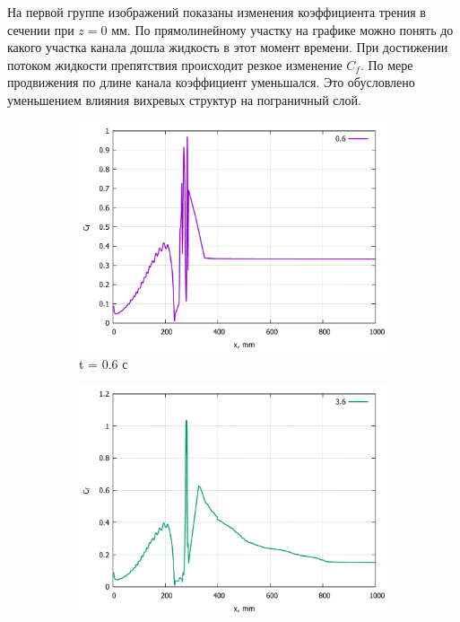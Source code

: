 	На первой группе изображений показаны изменения коэффициента трения в сечении при $z = 0$ мм. По прямолинейному участку на графике  можно понять до какого участка канала дошла жидкость в этот момент времени. При достижении потоком жидкости препятствия происходит резкое изменение $C_f$. По мере продвижения по длине канала коэффициент уменьшался. Это обусловлено уменьшением влияния вихревых структур на пограничный слой.
	\begin{figure}[H]
		\begin{subfigure}{.5\textwidth}
			\centering
			\includegraphics[width=1\linewidth]{../Assets/Cf-T06}
			\caption{t = 0.6 с}
			\label{fig:Cf-T06}
		\end{subfigure}%
		\begin{subfigure}{.5\textwidth}
			\centering
			\includegraphics[width=1\linewidth]{../Assets/Cf-T360}

\end{subfigure}
\end{figure}
